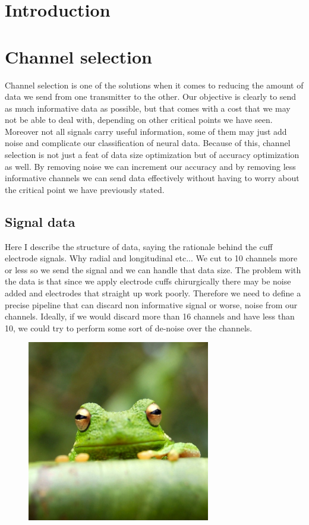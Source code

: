 \documentclass{Configuration_Files/PoliMi3i_thesis}
\begin{document}
\section{Introduction}

\section{Channel selection}

Channel selection is one of the  solutions when it comes to reducing the amount of data we send from one transmitter to the other.
Our objective is clearly to send as much informative data as possible, but that comes with a cost that we may not be able to deal with, depending on other critical points we have seen.
Moreover not all signals carry useful information, some of them may just add noise and complicate our classification of neural data.
Because of this, channel selection is not just a feat of data size optimization but of accuracy optimization as well.
By removing noise we can increment our accuracy and by removing less informative channels we can send data effectively without having to worry about the critical point we have previously stated.
\cite{abdullahEEGChannelSelection2022}


\subsection{Signal data}

Here I describe the structure of data, saying the rationale behind the cuff electrode signals.
Why radial and longitudinal etc...
We cut to 10 channels more or less so we send the signal and we can handle that data size.
The problem with the data is that since we apply electrode cuffs chirurgically there may be noise added and electrodes that straight up work poorly.
Therefore we need to define a precise pipeline that can discard non informative signal or worse, noise from our channels.
Ideally, if we would discard more than 16 channels and have less than 10, we could try to perform some sort of de-noise over the channels.


\begin{figure}[h]
      \includegraphics[width=8cm]{Images/frog.jpg}
\end{figure}
\end{document}
